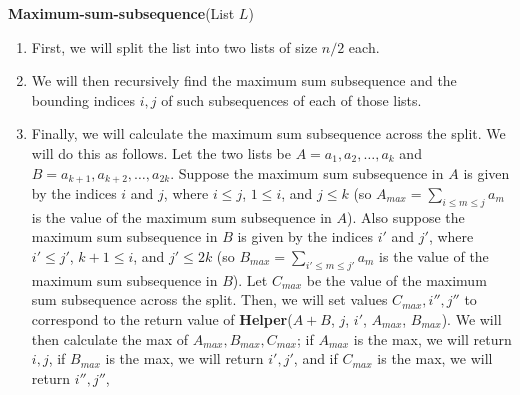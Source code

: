 \documentclass{article}
\begin{document}
\vspace{5mm}
\textbf{Maximum-sum-subsequence}(List $L$)
\begin{enumerate}
    \item First, we will split the list into two lists of size $n/2$ each.
    \item We will then recursively find the maximum sum subsequence and the
        bounding indices $i,j$ of such subsequences of each of those lists.
    \item Finally, we will calculate the maximum sum subsequence across the
        split. We will do this as follows. Let the two lists be $A = a_1, a_2,
        \dots, a_k$ and $B = a_{k+1}, a_{k+2}, \dots, a_{2k}$. Suppose the
        maximum sum subsequence in $A$ is given by the indices $i$ and $j$,
        where $i \leq j$, $1 \leq i$, and $j \leq k$ (so $A_{max} = \sum_{i \leq m \leq j}
        a_m$ is the value of the maximum sum subsequence in $A$). Also suppose the
        maximum sum subsequence in $B$ is given by the indices $i'$ and $j'$,
        where $i' \leq j'$, $k+1 \leq i$, and $j' \leq 2k$ (so $B_{max} =
        \sum_{i' \leq m \leq j'} a_m$ is the value of the maximum sum subsequence in $B$).
        Let $C_{max}$ be the value of the maximum sum subsequence across the
        split.  Then, we will set values $C_{max}, i'', j''$ to correspond to the return
        value of \textbf{Helper}($A + B$, $j$, $i'$, $A_{max}$, $B_{max}$). We
        will then calculate the max of $A_{max}, B_{max}, C_{max}$; if $A_{max}$
        is the max, we will return $i,j$, if $B_{max}$ is the max, we will return
        $i',j'$, and if $C_{max}$ is the max, we will return $i'',j''$,

\end{enumerate}

\vspace{5mm}
\end{document}
